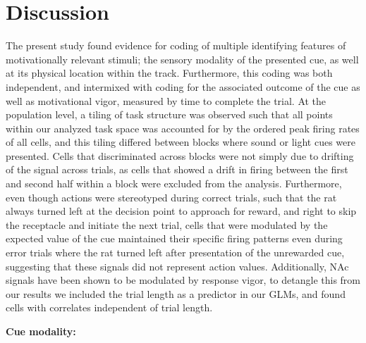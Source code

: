 \documentclass[11pt]{article}
\begin{document}
\section*{Discussion}

The present study found evidence for coding of multiple identifying features of motivationally relevant stimuli; the sensory modality of the presented cue, as well at its physical location within the track. Furthermore, this coding was both independent, and intermixed with coding for the associated outcome of the cue as well as motivational vigor, measured by time to complete the trial. At the population level, a tiling of task structure was observed such that all points within our analyzed task space was accounted for by the ordered peak firing rates of all cells, and this tiling differed between blocks where sound or light cues were presented.
Cells that discriminated across blocks were not simply due to drifting of the signal across trials, as cells that showed a drift in firing between the first and second half within a block were excluded from the analysis. Furthermore, even though actions were stereotyped during correct trials, such that the rat always turned left at the decision point to approach for reward, and right to skip the receptacle and initiate the next trial, cells that were modulated by the expected value of the cue maintained their specific firing patterns even during error trials where the rat turned left after presentation of the unrewarded cue, suggesting that these signals did not represent action values. Additionally, NAc signals have been shown to be modulated by response vigor, to detangle this from our results we included the trial length as a predictor in our GLMs, and found cells with correlates independent of trial length.

{\bf Cue modality:}  
\end{document}
